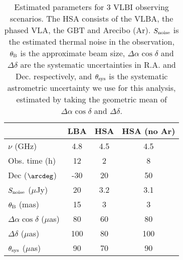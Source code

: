 \begin{table}
	\centering
	\caption[Specifications of the HSA and LBA]{Estimated parameters for 3 VLBI observing scenarios. The HSA consists of the VLBA, the phased VLA, the GBT and Arecibo (Ar). $S_{\rm noise}$ is the estimated thermal noise in the observation, $\theta_{\rm B}$ is the approximate beam size, $\Delta\alpha\cos\delta$ and $\Delta\delta$ are the systematic uncertainties in R.A. and Dec. respectively, and $\theta_{\rm sys}$ is the systematic astrometric uncertainty we use for this analysis, estimated by taking the geometric mean of $\Delta\alpha\cos\delta$ and $\Delta\delta$.}
	\label{tab:VLBI_properties}
	\begin{tabular}{lccc}
	    \hline
	    \hline
		 & LBA & HSA & HSA (no Ar)\\
		\hline
		$\nu$ (GHz) & 4.8 & 4.5 & 4.5\\
		Obs. time (h) & 12 & 2 & 8\\
		Dec ($\arcdeg$) & -30 & 20 & 50\\
		\rule{0pt}{4ex}$S_{\rm noise}$ ($\mu$Jy) & 20 & 3.2 & 3.1\\
		$\theta_{\rm B}$ (mas) & 15 & 3 & 3\\
		\rule{0pt}{4ex}$\Delta\alpha\cos\delta$ ($\mu$as) & 80 & 60 & 80\\
		$\Delta\delta$ ($\mu$as) & 100 & 80 & 100\\
		$\theta_{\rm sys}$ ($\mu$as) & 90 & 70 & 90\\
		\hline
		\hline
	\end{tabular}
\end{table}